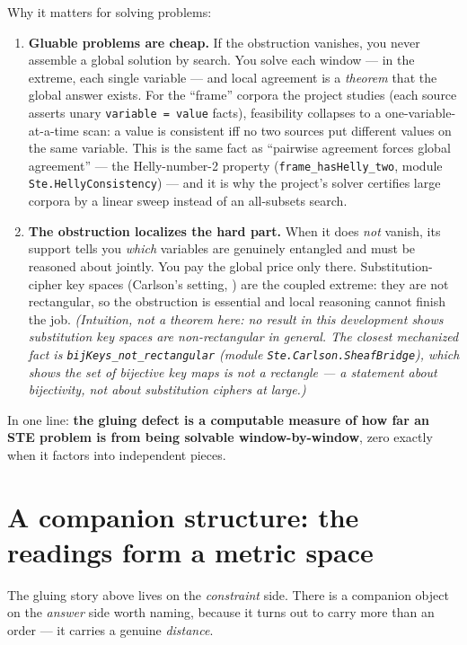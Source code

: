 \documentclass[11pt]{article}
\newcommand{\code}[1]{\texttt{#1}}
\begin{document}
Why it matters for solving problems:
\begin{enumerate}
\item \textbf{Gluable problems are cheap.}  If the obstruction
  vanishes, you never assemble a global solution by search.  You solve
  each window --- in the extreme, each single variable --- and local
  agreement is a \emph{theorem} that the global answer exists.  For the
  ``frame'' corpora the project studies (each source asserts unary
  \code{variable = value} facts), feasibility collapses to a
  one-variable-at-a-time scan: a value is consistent iff no two sources
  put different values on the same variable.  This is the same fact as
  ``pairwise agreement forces global agreement'' --- the Helly-number-2
  property (\code{frame\_hasHelly\_two}, module
  \code{Ste.HellyConsistency}) --- and it is why the project's solver
  certifies large corpora by a linear sweep instead of an all-subsets
  search.
\item \textbf{The obstruction localizes the hard part.}  When it does
  \emph{not} vanish, its support tells you \emph{which} variables are
  genuinely entangled and must be reasoned about jointly.  You pay the
  global price only there.  Substitution-cipher key spaces (Carlson's
  setting, \citealp{carlson2012}) are the coupled extreme: they are not
  rectangular, so the obstruction is essential and local reasoning
  cannot finish the job.  \emph{(Intuition, not a theorem here: no
  result in this development shows substitution key spaces are
  non-rectangular in general.  The closest mechanized fact is
  \code{bijKeys\_not\_rectangular} (module
  \code{Ste.Carlson.SheafBridge}), which shows the set of
  \emph{bijective} key maps is not a rectangle --- a statement about
  bijectivity, not about substitution ciphers at large.)}
\end{enumerate}

In one line: \textbf{the gluing defect is a computable measure of
how far an STE problem is from being solvable window-by-window},
zero exactly when it factors into independent pieces.

\section{A companion structure: the readings form a metric space}
The gluing story above lives on the \emph{constraint} side.  There is a
companion object on the \emph{answer} side worth naming, because it
turns out to carry more than an order --- it carries a genuine
\emph{distance}.
\end{document}
